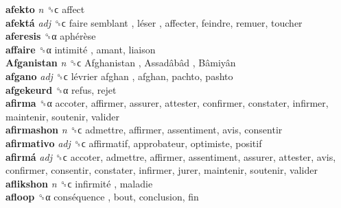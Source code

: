 \textbf{afekto} \emph{n}  ␝ϲ  affect  \\
\textbf{afektá} \emph{adj}  ␝ϲ   faire semblant ,  léser , affecter, feindre, remuer, toucher  \\
\textbf{aferesis} ␝α   aphérèse   \\
\textbf{affaire} ␝α   intimité , amant, liaison  \\
\textbf{Afganistan} \emph{n}  ␝ϲ   Afghanistan ,  Assadâbâd ,  Bâmiyân   \\
\textbf{afgano} \emph{adj}  ␝ϲ   lévrier afghan , afghan, pachto, pashto  \\
\textbf{afgekeurd} ␝α  refus, rejet  \\
\textbf{afirma} ␝α  accoter, affirmer, assurer, attester, confirmer, constater, infirmer, maintenir, soutenir, valider  \\
\textbf{afirmashon} \emph{n}  ␝ϲ  admettre, affirmer, assentiment, avis, consentir  \\
\textbf{afirmativo} \emph{adj}  ␝ϲ  affirmatif, approbateur, optimiste, positif  \\
\textbf{afirmá} \emph{adj}  ␝ϲ  accoter, admettre, affirmer, assentiment, assurer, attester, avis, confirmer, consentir, constater, infirmer, jurer, maintenir, soutenir, valider  \\
\textbf{aflikshon} \emph{n}  ␝ϲ   infirmité , maladie  \\
\textbf{afloop} ␝α   conséquence , bout, conclusion, fin  \\
